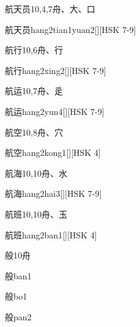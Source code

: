 \begin{Entry}{航天员}{10,4,7}{⾈、⼤、⼝}
  \begin{Phonetics}{航天员}{hang2tian1yuan2}[][HSK 7-9]
  \end{Phonetics}
\end{Entry}

\begin{Entry}{航行}{10,6}{⾈、⾏}
  \begin{Phonetics}{航行}{hang2xing2}[][HSK 7-9]
  \end{Phonetics}
\end{Entry}

\begin{Entry}{航运}{10,7}{⾈、⾡}
  \begin{Phonetics}{航运}{hang2yun4}[][HSK 7-9]
  \end{Phonetics}
\end{Entry}

\begin{Entry}{航空}{10,8}{⾈、⽳}
  \begin{Phonetics}{航空}{hang2kong1}[][HSK 4]
  \end{Phonetics}
\end{Entry}

\begin{Entry}{航海}{10,10}{⾈、⽔}
  \begin{Phonetics}{航海}{hang2hai3}[][HSK 7-9]
  \end{Phonetics}
\end{Entry}

\begin{Entry}{航班}{10,10}{⾈、⽟}
  \begin{Phonetics}{航班}{hang2ban1}[][HSK 4]
  \end{Phonetics}
\end{Entry}

\begin{Entry}{般}{10}{⾈}
  \begin{Phonetics}{般}{ban1}
  \end{Phonetics}
  \begin{Phonetics}{般}{bo1}
  \end{Phonetics}
  \begin{Phonetics}{般}{pan2}
  \end{Phonetics}
\end{Entry}

